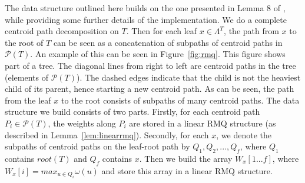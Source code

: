 \documentclass{article}
\newcommand{\leafset}{\Lambda}
\newcommand{\weight}{\omega}
\begin{document}
    The data structure outlined here builds on the one presented in Lemma 8 of \cite{jansson2018algorithms}, while providing some further details of the implementation. We do a complete centroid path decomposition on $T$. Then for each leaf $x \in \leafset^T$, the path from $x$ to the root of $T$ can be seen as a concatenation of subpaths of centroid paths in $\mathcal{P}(T)$. An example of this can be seen in Figure~\ref{fig:rmq}. This figure shows part of a tree. The diagonal lines from right to left are centroid paths in the tree (elements of $\mathcal{P}(T)$). The dashed edges indicate that the child is not the heaviest child of its parent, hence starting a new centroid path. As can be seen, the path from the leaf $x$ to the root consists of subpaths of many centroid paths. The data structure we build consists of two parts. Firstly, for each centroid path $P_i \in \mathcal{P}(T)$, the weights along $P_i$ are stored in a linear RMQ structure (as described in Lemma~\ref{lem:linearrmq}). Secondly, for each $x$, we denote the subpaths of centroid paths on the leaf-root path by $Q_1, Q_2, ..., Q_f$, where $Q_1$ contains $root(T)$ and $Q_f$ contains $x$. Then we build the array $W_x[1 ... f]$, where $W_x[i] = max_{u \in Q_i} \weight(u)$ and store this array in a linear RMQ structure.
    \newline
\end{document}
